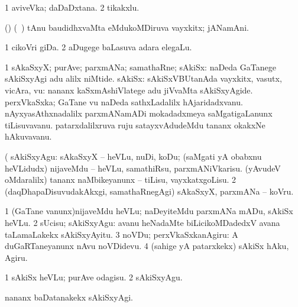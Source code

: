 \bentry
{} 
\gl{\nA}
\expl{}
\bmng
\bnum
\num{1} aviveVka; daDaDxtana. 
\num{2} tikakxlu. 
\enum
\emng
\eentry

\bentry
{} 
\gl{\nA}
\expl{}
\bmng
(\pArxparx) (\sA\ \hiV) tAnu baudidhxvaMta eMdukoMDiruva vayxkitx; jANamAni. 
\emng
\eentry

\bentry
{} 
\gl{\nA}
\expl{}
\bmng
\bnum
\num{1} cikoVri giDa. 
\num{2} aDugege baLasuva adara elegaLu. 
\enum
\emng
\eentry

\bentry
{} 
\gl{\nA}
\expl{}
\bmng
\bnum
\num{1} sAkaSxyX; purAve; parxmANa; samathaRne; sAkiSx:  naDeda GaTanege sAkiSxyAgi adu alilx niMtide. 
 sAkiSx: 
\banum
{} sAkiSxVBUtanAda vayxkitx, vasutx, vicAra, \mo vu:  nananx kaSxmAshiVlatege adu jiVvaMta sAkiSxyAgide. 
 perxVkaSxka; GaTane \mo vu naDeda sathxLadalilx hAjaridadxvanu. 
 nAyxyasAthxnadalilx parxmANamADi mokadadxmeya saMgatigaLanunx tiLisuvavanu. 
 patarxdalilxruva ruju satayxvAdudeMdu tananx okakxNe hAkuvavanu. 
\eanum
\numie
\enum
\emng

\noindent
\gl{\pagu}
\expl{}
\bmng
\bnum
{}  (  
\banum
{} sAkiSxyAgu: sAkaSxyX -- heVLu, nuDi, koDu; (saMgati yA obabxnu heVLidudx) nijaveMdu -- heVLu, samathiRsu, parxmANiVkarisu. 
 (yAvudeV oMdaralilx) tananx naMbikeyanunx -- tiLisu, vayxkatxgoLisu. 
\eanum
\numie
\num{2}  (daqDhapaDisuvudakAkxgi, samathaRnegAgi) sAkaSxyX, parxmANa -- koVru. 
\enum
\emng
\eentry

\bentry
{} 
\gl{\sakirx}
\expl{}
\bmng
\bnum
\num{1} (GaTane \mo vanunx)nijaveMdu heVLu; naDeyiteMdu parxmANa mADu, sAkiSx heVLu. 
\num{2} sUcisu; sAkiSxyAgu:  avanu heNadaMte biLicikoMDadedxV avana taLamaLakekx sAkiSxyAyitu. 
\num{3} noVDu; perxVkaSxkanAgiru:  A duGaRTaneyanunx nAvu noVDidevu. 
\num{4} (sahige yA patarxkekx) sAkiSx hAku, Agiru. 
\enum
\emng

\noindent
\gl{\akirx}
\expl{}
\bmng
\bnum
\num{1} sAkiSx heVLu; purAve odagisu. 
\num{2} sAkiSxyAgu.
\enum
\emng

\noindent 
\gl{\pagu}
\expl{}
\bmng
{}  nananx baDatanakekx sAkiSxyAgi. 
\emng
\eentry

